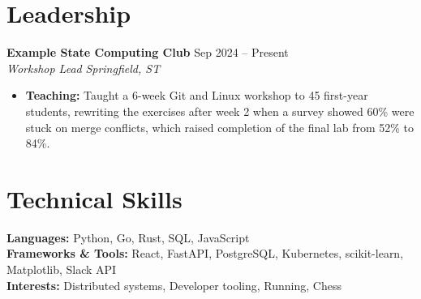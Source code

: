 \documentclass[10pt,letterpaper]{article}
\begin{document}
\section*{Leadership}
\textbf{Example State Computing Club} \hfill Sep 2024 -- Present \\[-2pt]
\textit{Workshop Lead} \hfill \textit{Springfield, ST}
\begin{itemize}[noitemsep,topsep=2pt]
    \item \textbf{Teaching:} Taught a 6-week Git and Linux workshop to 45 first-year students, rewriting the exercises after week 2 when a survey showed 60\% were stuck on merge conflicts, which raised completion of the final lab from 52\% to 84\%.
\end{itemize}

\section*{Technical Skills}

\textbf{Languages:} Python, Go, Rust, SQL, JavaScript \\[0.5pt]
\textbf{Frameworks \& Tools:} React, FastAPI, PostgreSQL, Kubernetes, scikit-learn, Matplotlib, Slack API \\[0.5pt]
\textbf{Interests:} Distributed systems, Developer tooling, Running, Chess
\end{document}
